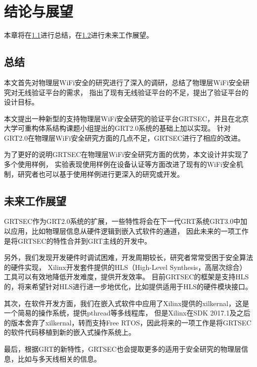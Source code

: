 
\chapter{结论与展望}
本章将在\ref{sec:conclusion}进行总结，在\ref{sec:future_work}进行未来工作展望。

  \section{总结}\label{sec:conclusion}
  本文首先对物理层WiFi安全的研究进行了深入的调研，总结了物理层WiFi安全研究对无线验证平台的需求，
  指出了现有无线验证平台的不足，提出了验证平台的设计目标。

  本文提出一种新型的支持物理层WiFi安全研究的验证平台GRTSEC，并且在北京大学可重构体系结构课题小组提出的GRT2.0系统的基础上加以实现。
  针对GRT2.0在物理层WiFi安全研究方面的几点不足，GRTSEC进行了相应的改进。

  为了更好的说明GRTSEC在物理层WiFi安全研究方面的优势，本文设计并实现了多个使用样例，
  实验表现使用样例在设备认证等方面改进了现有的WiFi安全机制，研究者也可以基于使用样例进行更深入的研究或开发。

  \section{未来工作展望}\label{sec:future_work}
  GRTSEC作为GRT2.0系统的扩展，一些特性将会在下一代GRT系统GRT3.0中加以应用，比如物理层信息从硬件逻辑到嵌入式软件的通道，
  因此未来的一项工作是将GRTSEC的特性合并到GRT主线的开发中。

  另外，我们发现开发硬件时调试困难，开发周期较长，研究者常常受困于安全算法的硬件实现，
  Xilinx开发套件提供的HLS（High-Level Synthesis，高层次综合）\cite{xilinxhls}工具可以有效地降低开发难度，提供开发效率。
  目前GRTSEC的框架是支持HLS的，将来希望针对HLS进行进一步地优化，比如提供适用于HLS的硬件模块接口。

  其次，在软件开发方面，我们在嵌入式软件中应用了Xilinx提供的xilkernal，这是一个简易的操作系统，提供pthread等多线程库，
  但是Xilinx在SDK 2017.1及之后的版本舍弃了xilkernal，转而支持Free RTOS，因此将来的一项工作是将GRTSEC的软件代码移植到新的嵌入式操作系统上。

  最后，根据GRT的新特性，GRTSEC也会提取更多的适用于安全研究的物理层信息，比如与多天线相关的信息。

